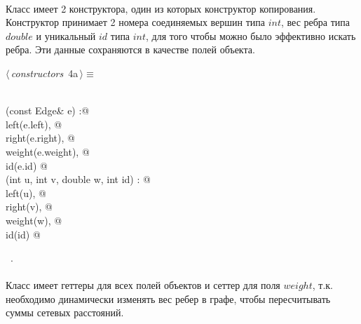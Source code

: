 \documentclass[12pt]{article}
\begin{document}
\paragraph{}
Класс имеет 2 конструктора, один из которых конструктор копирования.
Конструктор принимает 2 номера соединяемых вершин типа $int$, 
вес ребра типа $double$ и уникальный $id$ типа $int$, для того чтобы 
можно было эффективно искать ребра. Эти данные сохраняются в качестве
полей объекта. 

\begin{flushleft} \small
\begin{minipage}{\linewidth}\label{scrap2}\raggedright\small
{} $\langle\,${\itshape constructors}\nobreak\ {\footnotesize {4a}}$\,\rangle\equiv$
\vspace{-1ex}
\begin{list}{}{} \item
\mbox{}\verb@@\\
\mbox{}\verb@Edge(const Edge& e) :@\\
\mbox{}\verb@    left(e.left), @\\
\mbox{}\verb@    right(e.right), @\\
\mbox{}\verb@    weight(e.weight), @\\
\mbox{}\verb@    id(e.id) { }@\\
\mbox{}\verb@Edge(int u, int v, double w, int id) : @\\
\mbox{}\verb@    left(u), @\\
\mbox{}\verb@    right(v), @\\
\mbox{}\verb@    weight(w), @\\
\mbox{}\verb@    id(id) { }@\\
\mbox{}\verb@@{\NWsep}
\end{list}
\vspace{-1.5ex}
\footnotesize
\begin{list}{}{\setlength{\itemsep}{-\parsep}\setlength{\itemindent}{-\leftmargin}}
\item \NWtxtMacroRefIn\ .

\item{}
\end{list}
\end{minipage}\vspace{4ex}
\end{flushleft}
\paragraph{}
Класс имеет геттеры для всех полей объектов и сеттер для поля $weight$, т.к.
необходимо динамически изменять вес ребер в графе, чтобы пересчитывать суммы сетевых расстояний.
\end{document}
